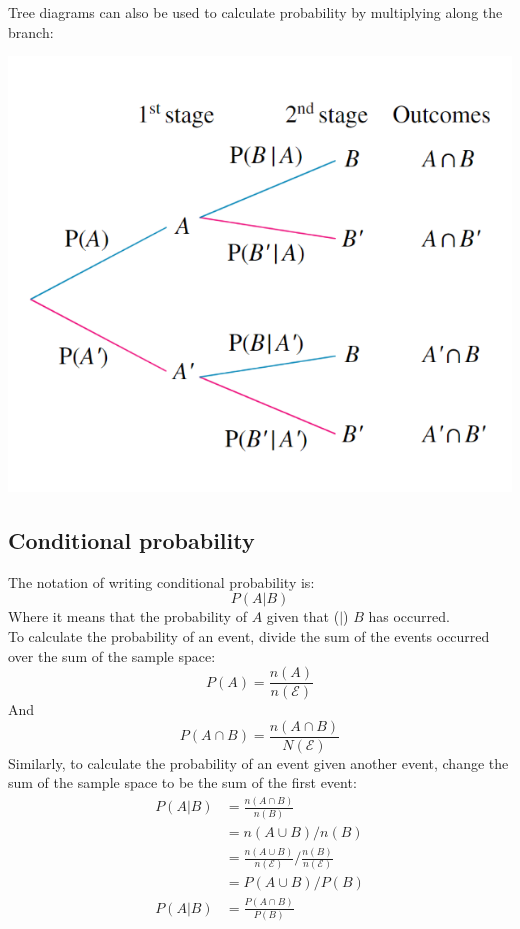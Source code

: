 \documentclass[a4paper,10pt]{report}
\begin{document}
Tree diagrams can also be used to calculate probability by multiplying along the branch:
\begin{center}
	\includegraphics[scale=0.5]{tree diagrams probability}
\end{center}

\subsection{Conditional probability}
The notation of writing conditional probability is:
$$
	P(A|B)
$$
Where it means that the probability of $A$ given that ($|$) $B$ has occurred.\\

To calculate the probability of an event, divide the sum of the events occurred over the sum of the sample space:
$$
	P(A) = \frac{n(A)}{n(\mathcal{E})}
$$
And
$$
	P(A \cap B) = \frac{n(A \cap B)}{N(\mathcal{E})}
$$
Similarly, to calculate the probability of an event given another event, change the sum of the sample space to be the sum of the first event:
\begin{align*}
	P(A|B) & = \frac{n(A \cap B)}{n(B)}                                         \\
	       & = n(A \cup B) / n(B)                                               \\
	       & = \frac{n(A \cup B)}{n(\mathcal{E})} / \frac{n(B)}{n(\mathcal{E})} \\
	       & = P(A \cup B) / P(B)                                               \\
	P(A|B) & = \frac{P(A \cap B)}{P(B)}
\end{align*}
\end{document}

